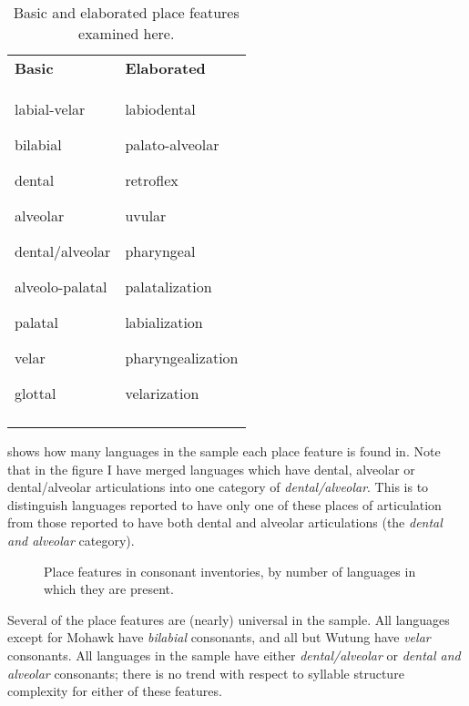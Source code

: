 \begin{table}
\begin{tabularx}{\textwidth}{XX}
\lsptoprule

\textbf{Basic} & \textbf{Elaborated}\\
labial-velar

bilabial

dental

alveolar

dental/alveolar

alveolo-palatal

palatal

velar

glottal & labiodental

palato-alveolar

retroflex

uvular

pharyngeal

palatalization

labialization

pharyngealization

velarization\\
\lspbottomrule
\end{tabularx}
\caption{\label{tab:4.13}Basic and elaborated place features examined here.}
\end{table}

   shows how many languages in the sample each place feature is found in. Note that in the figure I have merged languages which have dental, alveolar or dental/alveolar articulations into one category of \textit{dental/alveolar}. This is to distinguish languages reported to have only one of these places of articulation from those reported to have both dental and alveolar articulations (the \textit{dental and alveolar} category).


\begin{figure}  
\caption{\label{fig:4.7} Place features in consonant inventories, by number of languages in which they are present.}
\end{figure}

  Several of the place features are (nearly) universal in the sample. All languages except for Mohawk have \textit{bilabial} consonants, and all but Wutung have \textit{velar} consonants. All languages in the sample have either \textit{dental/alveolar} or \textit{dental and alveolar} consonants; there is no trend with respect to syllable structure complexity for either of these features.

